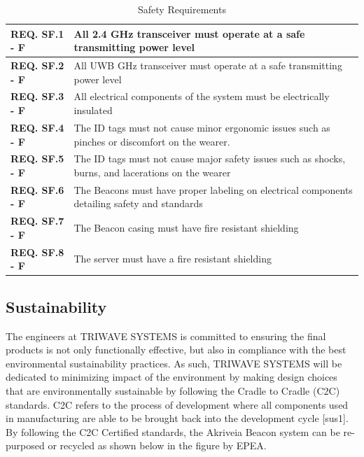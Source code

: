 \bgroup
\def\arraystretch{1.5}
\begin{table}[H]
\centering
\begin{tabular}{ | m{3cm} | m{13cm}| } 
\hline
\textbf{REQ. SF.1 - F} & All 2.4 GHz transceiver must operate at a safe transmitting power level\\
\hline
\textbf{REQ. SF.2 - F} &  All UWB GHz transceiver must operate at a safe transmitting power level\\
\hline
\textbf{REQ. SF.3 - F} & All electrical components of the system must be electrically insulated \\
\hline
\textbf{REQ. SF.4 - F} & The ID tags must not cause minor ergonomic issues such as pinches or discomfort on the wearer.\\
\hline
\textbf{REQ. SF.5 - F} & The ID tags must not cause major safety issues such as shocks, burns, and lacerations on the wearer\\
\hline
\textbf{REQ. SF.6 - F} & The Beacons must have proper labeling on electrical components detailing safety and standards \\
\hline
\textbf{REQ. SF.7 - F} & The Beacon casing must have fire resistant shielding \\
\hline
\textbf{REQ. SF.8 - F} & The server must have a fire resistant shielding \\
\hline
\end{tabular}
\caption{Safety Requirements}
\end{table}	

\break
\subsection{Sustainability}
\bigskip
The engineers at TRIWAVE SYSTEMS is committed to ensuring the final products is not only functionally effective, but also in compliance with the best environmental sustainability practices. As such, TRIWAVE SYSTEMS will be dedicated to minimizing impact of the environment by making design choices that are environmentally sustainable by following the Cradle to Cradle (C2C) standards. C2C refers to the process of development where all components used in manufacturing are able to be brought back into the development cycle [sus1]. By following the C2C Certified standards, the Akriveia Beacon system can be re-purposed or recycled as shown below in the figure by EPEA.

